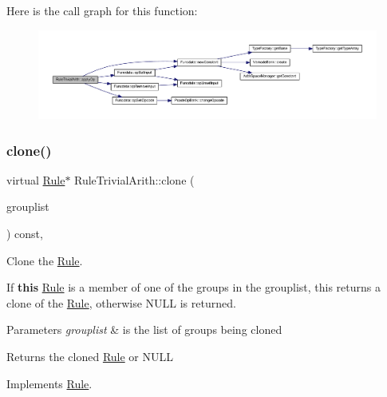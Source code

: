 Here is the call graph for this function\+:
\nopagebreak
\begin{figure}[H]
\begin{center}
\leavevmode
\includegraphics[width=350pt]{class_rule_trivial_arith_a692632ff3e5fa2bad3ba12b6ff2005be_cgraph}
\end{center}
\end{figure}
\mbox{\label{class_rule_trivial_arith_a2c92af6c8447390481239efa67e5ece7}} 
\subsubsection{\texorpdfstring{clone()}{clone()}}
{\footnotesize\ttfamily virtual \mbox{\hyperlink{class_rule}{Rule}}$\ast$ Rule\+Trivial\+Arith\+::clone (\begin{DoxyParamCaption}\item[{const \mbox{\hyperlink{class_action_group_list}{Action\+Group\+List}} \&}]{grouplist }\end{DoxyParamCaption}) const\hspace{0.3cm}{\ttfamily [inline]}, {\ttfamily [virtual]}}



Clone the \mbox{\hyperlink{class_rule}{Rule}}. 

If {\bfseries{this}} \mbox{\hyperlink{class_rule}{Rule}} is a member of one of the groups in the grouplist, this returns a clone of the \mbox{\hyperlink{class_rule}{Rule}}, otherwise N\+U\+LL is returned. 
\begin{DoxyParams}{Parameters}
{\em grouplist} & is the list of groups being cloned \\
\hline
\end{DoxyParams}
\begin{DoxyReturn}{Returns}
the cloned \mbox{\hyperlink{class_rule}{Rule}} or N\+U\+LL 
\end{DoxyReturn}


Implements \mbox{\hyperlink{class_rule_a70de90a76461bfa7ea0b575ce3c11e4d}{Rule}}.



